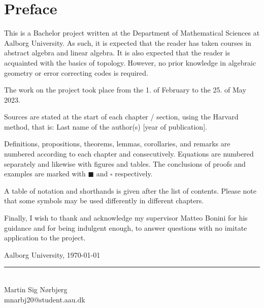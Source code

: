 \chapter{Preface}

This is a Bachelor project written at the Department of Mathematical Sciences at Aalborg University.
As such, it is expected that the reader has taken courses in abstract algebra and linear algebra.
It is also expected that the reader is acquainted with the basics of topology. However, no prior knowledge in algebraic geometry or error correcting codes is required.

The work on the project took place from the 1. of February to the 25. of May 2023.

Sources are stated at the start of each chapter / section, using the Harvard method, that is: Last name of the author(s) [year of publication].

Definitions, propositions, theorems, lemmas, corollaries, and remarks are numbered according to each chapter and consecutively.
Equations are numbered separately and likewise with figures and tables.
The conclusions of proofs and examples are marked with $\blacksquare$ and $\square$ respectively.

A table of notation and shorthands is given after the list of contents.
Please note that some symbols may be used differently in different chapters.

Finally, I wish to thank and acknowledge my supervisor Matteo Bonini for his guidance and for being indulgent enough, to answer questions with no imitate application to the project.

\vspace{\baselineskip}\hfill Aalborg University, \today
\vfill\noindent

\begin{minipage}[H]{\textwidth}
 \centering
 \rule{\textwidth / 2}{1pt}\\
  Martin Sig Nørbjerg\\
 {\footnotesize mnarbj20@student.aau.dk}
\end{minipage}
\hfill

